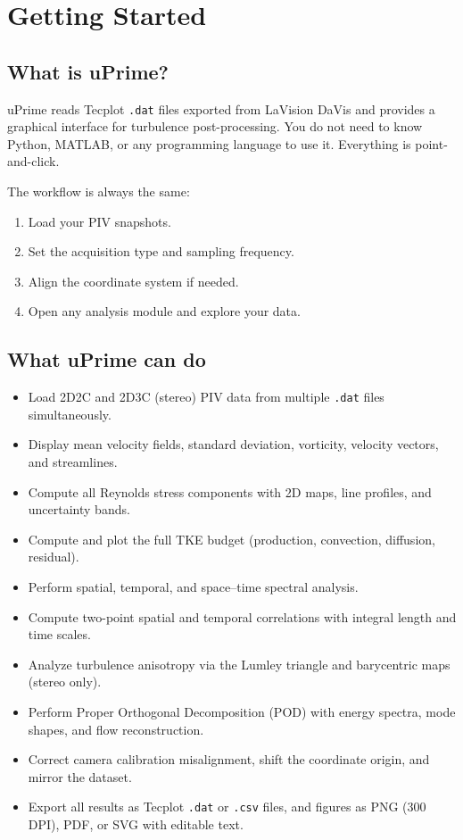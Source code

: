 \documentclass[11pt, a4paper]{report}
\newcommand{\software}[1]{\textsf{#1}}
\begin{document}
\tableofcontents
\clearpage

\chapter{Getting Started}

\section{What is uPrime?}

\software{uPrime} reads Tecplot \texttt{.dat} files exported from LaVision DaVis and provides a graphical interface for turbulence post-processing. You do not need to know Python, MATLAB, or any programming language to use it. Everything is point-and-click.

The workflow is always the same:
\begin{enumerate}[leftmargin=1.5em]
  \item Load your PIV snapshots.
  \item Set the acquisition type and sampling frequency.
  \item Align the coordinate system if needed.
  \item Open any analysis module and explore your data.
\end{enumerate}

\section{What uPrime can do}

\begin{itemize}[leftmargin=1.5em]
  \item Load 2D2C and 2D3C (stereo) PIV data from multiple \texttt{.dat} files simultaneously.
  \item Display mean velocity fields, standard deviation, vorticity, velocity vectors, and streamlines.
  \item Compute all Reynolds stress components with 2D maps, line profiles, and uncertainty bands.
  \item Compute and plot the full TKE budget (production, convection, diffusion, residual).
  \item Perform spatial, temporal, and space--time spectral analysis.
  \item Compute two-point spatial and temporal correlations with integral length and time scales.
  \item Analyze turbulence anisotropy via the Lumley triangle and barycentric maps (stereo only).
  \item Perform Proper Orthogonal Decomposition (POD) with energy spectra, mode shapes, and flow reconstruction.
  \item Correct camera calibration misalignment, shift the coordinate origin, and mirror the dataset.
  \item Export all results as Tecplot \texttt{.dat} or \texttt{.csv} files, and figures as PNG (300 DPI), PDF, or SVG with editable text.
\end{itemize}
\end{document}
